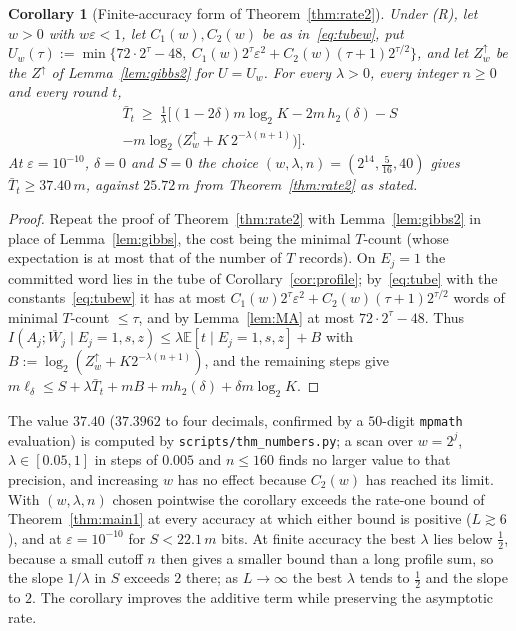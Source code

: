 \documentclass[aps,prx,twocolumn,superscriptaddress,nofootinbib,longbibliography]{revtex4-2}
\theoremstyle{plain}
\newtheorem{corollary}{Corollary}
\theoremstyle{definition}
\theoremstyle{remark}
\newcommand{\E}{\mathbb{E}}
\begin{document}
\begin{corollary}[Finite-accuracy form of Theorem~\ref{thm:rate2}]\label{cor:finite}
Under (R), let $w>0$ with $w\varepsilon<1$, let $C_1(w),C_2(w)$ be as in~\eqref{eq:tubew}, put $U_w(\tau):=\min\{72\cdot2^\tau-48,\ C_1(w)2^\tau\varepsilon^2+C_2(w)(\tau+1)2^{\tau/2}\}$, and let $Z^\uparrow_w$ be the $Z^\uparrow$ of Lemma~\ref{lem:gibbs2} for $U=U_w$. For every $\lambda>0$, every integer $n\ge0$ and every round $t$,
\begin{multline}
\bar T_t\ \ge\ \frac1\lambda\Big[(1-2\delta)m\log_2K-2m\,h_2(\delta)-S\\
-m\log_2\!\big(Z^\uparrow_w+K\,2^{-\lambda(n+1)}\big)\Big].
\end{multline}
At $\varepsilon=10^{-10}$, $\delta=0$ and $S=0$ the choice $(w,\lambda,n)=(2^{14},\tfrac5{16},40)$ gives $\bar T_t\ge37.40\,m$, against $25.72\,m$ from Theorem~\ref{thm:rate2} as stated.
\end{corollary}
\begin{proof}
Repeat the proof of Theorem~\ref{thm:rate2} with Lemma~\ref{lem:gibbs2} in place of Lemma~\ref{lem:gibbs}, the cost being the minimal $T$-count (whose expectation is at most that of the number of $T$ records). On $E_j=1$ the committed word lies in the tube of Corollary~\ref{cor:profile}; by~\eqref{eq:tube} with the constants~\eqref{eq:tubew} it has at most $C_1(w)2^\tau\varepsilon^2+C_2(w)(\tau+1)2^{\tau/2}$ words of minimal $T$-count $\le\tau$, and by Lemma~\ref{lem:MA} at most $72\cdot2^\tau-48$. Thus $I(A_j;\overline W_j\mid E_j=1,s,z)\le\lambda\E[t\mid E_j=1,s,z]+B$ with $B:=\log_2(Z^\uparrow_w+K2^{-\lambda(n+1)})$, and the remaining steps give $m\ell_\delta\le S+\lambda\bar T_t+mB+mh_2(\delta)+\delta m\log_2K$.
\end{proof}
The value $37.40$ ($37.3962$ to four decimals, confirmed by a $50$-digit \texttt{mpmath} evaluation) is computed by \texttt{scripts/thm\_numbers.py}; a scan over $w=2^j$, $\lambda\in[0.05,1]$ in steps of $0.005$ and $n\le160$ finds no larger value to that precision, and increasing $w$ has no effect because $C_2(w)$ has reached its limit. With $(w,\lambda,n)$ chosen pointwise the corollary exceeds the rate-one bound of Theorem~\ref{thm:main1} at every accuracy at which either bound is positive ($L\gtrsim6$), and at $\varepsilon=10^{-10}$ for $S<22.1\,m$ bits. At finite accuracy the best $\lambda$ lies below $\tfrac12$, because a small cutoff $n$ then gives a smaller bound than a long profile sum, so the slope $1/\lambda$ in $S$ exceeds $2$ there; as $L\to\infty$ the best $\lambda$ tends to $\tfrac12$ and the slope to $2$. The corollary improves the additive term while preserving the asymptotic rate.
\end{document}
